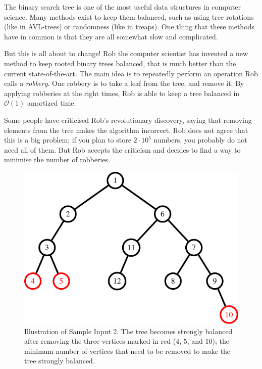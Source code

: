 
The binary search tree is one of the most useful data structures in computer
science. Many \mbox{methods} %
exist to keep them balanced, such as using tree rotations (like in AVL-trees) or randomness (like in treaps).
One thing that these methods have in common is that they are all somewhat slow and complicated.

But this is all about to change! Rob the computer scientist has invented a new method to keep
rooted binary trees balanced, that is much better than the current state-of-the-art. The main idea
is to repeatedly perform an operation Rob calls a \textit{robbery}. One robbery is to take a leaf
from the tree, and remove it. By applying robberies at the right times, Rob is able to keep a tree balanced
in $\mathcal{O}(1)$ amortized time.

Some people have criticised Rob's revolutionary discovery, saying that removing elements from the tree
makes the algorithm incorrect. Rob does not agree that this is a big problem; if you
plan to store $2 \cdot 10^5$ numbers, you probably do not need all of them.
But Rob accepts the criticism and decides to find a way to minimise the number of robberies.

\begin{figure}[h]
  \centering
  \includegraphics{sample}
  \caption{Illustration of Sample Input 2. The tree becomes strongly balanced
	after removing the three vertices marked in red ($4$, $5$, and $10$);
	the minimum number of vertices that need to be removed to make the tree
	strongly balanced.}
  \label{fig:h}
\end{figure}

